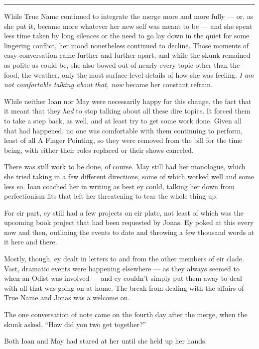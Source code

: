 \begin{center}\rule{0.5\linewidth}{0.5pt}\end{center}

While True Name continued to integrate the merge more and more fully — or, as she put it, became more whatever her new self was meant to be — and she spent less time taken by long silences or the need to go lay down in the quiet for some lingering conflict, her mood nonetheless continued to decline. Those moments of easy conversation came further and further apart, and while the skunk remained as polite as could be, she also bowed out of nearly every topic other than the food, the weather, only the most surface-level details of how she was feeling. \emph{I am not comfortable talking about that, now} became her constant refrain.

While neither Ioan nor May were necessarily happy for this change, the fact that it meant that they \emph{had} to stop talking about all these dire topics. It forced them to take a step back, as well, and at least try to get some work done. Given all that had happened, no one was comfortable with them continuing to perform, least of all A Finger Pointing, so they were removed from the bill for the time being, with either their roles replaced or their shows canceled.

There was still work to be done, of course. May still had her monologue, which she tried taking in a few different directions, some of which worked well and some less so. Ioan coached her in writing as best ey could, talking her down from perfectionism fits that left her threatening to tear the whole thing up.

For eir part, ey still had a few projects on eir plate, not least of which was the upcoming book project that had been requested by Jonas. Ey poked at this every now and then, outlining the events to date and throwing a few thousand words at it here and there.

Mostly, though, ey dealt in letters to and from the other members of eir clade. Vast, dramatic events were happening elsewhere — as they always seemed to when an Odist was involved — and ey couldn't simply put them away to deal with all that was going on at home. The break from dealing with the affairs of True Name and Jonas was a welcome on.

The one conversation of note came on the fourth day after the merge, when the skunk asked, ``How did you two get together?''

Both Ioan and May had stared at her until she held up her hands.


